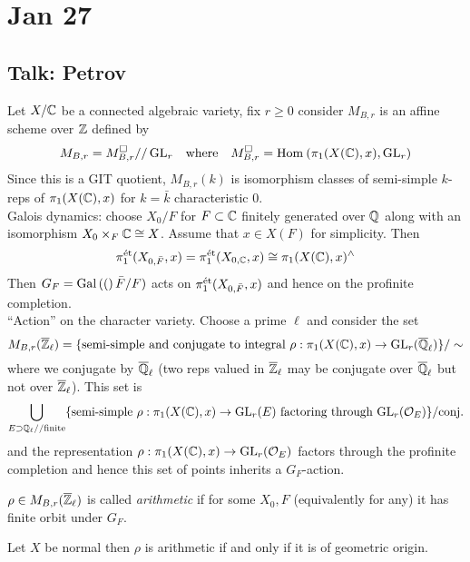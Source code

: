 \documentclass[12pt]{article}
\begin{document}
\section{Jan 27}

\subsection{Talk: Petrov}

Let $X / \mathbb{C}$ be a connected algebraic variety, fix $r \ge 0$ consider $M_{B,r}$ is an affine scheme over $\mathbb{Z}$ defined by 
\[ M_{B,r} = M_{B,r}^{\square} // \, \mathrm{GL}_r \quad \text{where} \quad M_{B,r}^{\square} = \mathrm{Hom}_{} \left( \pi_1(X(\mathbb{C}), x), \mathrm{GL}_r \right) \]
Since this is a GIT quotient, $M_{B,r}(k)$ is isomorphism classes of semi-simple $k$-reps of $\pi_1(X(\mathbb{C}), x)$ for $k = \bar{k}$ characteristic $0$. 
\\
Galois dynamics: choose $X_0 / F$ for $F \subset \mathbb{C}$ finitely generated over $\mathbb{Q}$ along with an isomorphism $X_0 \times_F \mathbb{C} \cong X$. Assume that $x \in X(F)$ for simplicity. Then 
\[ \pi_1^{\text{\'{e}t}}(X_{0, \bar{F}}, x) = \pi_1^{\text{\'{e}t}}(X_{0, \mathbb{C}}, x) \cong \pi_1(X(\mathbb{C}), x)^{\wedge} \]
Then $G_F = \mathrm{Gal}\left( ( \right)\bar{F}/F)$ acts on $\pi_1^{\text{\'{e}t}}(X_{0,\bar{F}}, x)$ and hence on the profinite completion. 
\\
``Action'' on the character variety. Choose a prime $\ell$ and consider the set 
\[ M_{B,r}(\overline{\mathbb{Z}}_{\ell}) = \{ \text{semi-simple and conjugate to integral } \rho : \pi_1(X(\mathbb{C}), x) \to \mathrm{GL}_r(\overline{\mathbb{Q}}_{\ell}) \} / \sim \]
where we conjugate by $\overline{\mathbb{Q}}_{\ell}$ (two reps valued in $\overline{\mathbb{Z}}_{\ell}$ may be conjugate over $\overline{\mathbb{Q}}_{\ell}$ but not over $\overline{\mathbb{Z}}_{\ell}$). This set is
\[ \bigcup_{\substack{E \supset \mathbb{Q}_{\ell} // \text{finite}}} \{ \text{semi-simple } \rho : \pi_1(X(\mathbb{C}), x) \to \mathrm{GL}_r(E) \text{ factoring through } \mathrm{GL}_r(\mathcal{O}_{E}) \} / \text{conj.} \]
and the representation $\rho : \pi_1(X(\mathbb{C}), x) \to \mathrm{GL}_r(\mathcal{O}_{E})$ factors through the profinite completion and hence this set of points inherits a $G_F$-action. 

\begin{defn}
$\rho \in M_{B,r}(\overline{\mathbb{Z}}_\ell)$ is called \textit{arithmetic} if for some $X_0, F$ (equivalently for any) it has finite orbit under $G_F$.
\end{defn}

\begin{conj}
Let $X$ be normal then $\rho$ is arithmetic if and only if it is of geometric origin. 
\end{conj}
\end{document}
